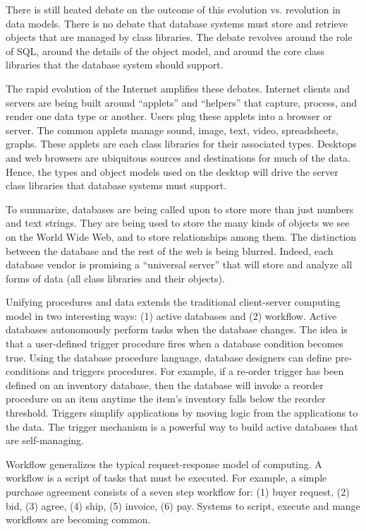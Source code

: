 \documentclass[a4paper,12pt,notitlepage,twoside,openright]{article}
\begin{document}
There is still heated debate on the outcome of this evolution vs.
revolution in data models. There is no debate that database systems must
store and retrieve objects that are managed by class libraries. The
debate revolves around the role of SQL, around the details of the object
model, and around the core class libraries that the database system
should support.

The rapid evolution of the Internet amplifies these debates. Internet
clients and servers are being built around ``applets'' and ``helpers''
that capture, process, and render one data type or another. Users plug
these applets into a browser or server. The common applets manage sound,
image, text, video, spreadsheets, graphs. These applets are each class
libraries for their associated types. Desktops and web browsers are
ubiquitous sources and destinations for much of the data. Hence, the
types and object models used on the desktop will drive the server class
libraries that database systems must support.

To summarize, databases are being called upon to store more than just
numbers and text strings. They are being used to store the many kinds of
objects we see on the World Wide Web, and to store relationships among
them. The distinction between the database and the rest of the web is
being blurred. Indeed, each database vendor is promising a ``universal
server'' that will store and analyze all forms of data (all class
libraries and their objects).

Unifying procedures and data extends the traditional client-server
computing model in two interesting ways: (1) active databases and (2)
workflow. Active databases autonomously perform tasks when the database
changes. The idea is that a user-defined trigger procedure fires when a
database condition becomes true. Using the database procedure language,
database designers can define pre-conditions and triggers procedures.
For example, if a re-order trigger has been defined on an inventory
database, then the database will invoke a reorder procedure on an item
anytime the item's inventory falls below the reorder threshold. Triggers
simplify applications by moving logic from the applications to the data.
The trigger mechanism is a powerful way to build active databases that
are self-managing.

Workflow generalizes the typical request-response model of computing. A
workflow is a script of tasks that must be executed. For example, a
simple purchase agreement consists of a seven step workflow for: (1)
buyer request, (2) bid, (3) agree, (4) ship, (5) invoice, (6) pay.
Systems to script, execute and mange workflows are becoming common.
\end{document}
